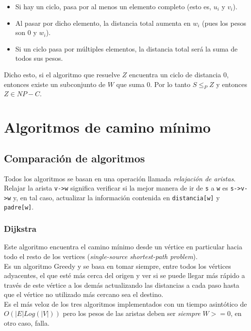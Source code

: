 \documentclass{article}
\def\code#1{\texttt{#1}}
\newcommand\tab[1][0.5cm]{\hspace*{#1}}
\begin{document}
\begin{enumerate}
\begin{itemize}
                    \item Si hay un ciclo, pasa por al menos un elemento completo (esto es, $u_{i}$ y $v_{i}$).
                    \item Al pasar por dicho elemento, la distancia total aumenta en $w_{i}$ (pues los pesos son $0$
                    y $w_{i}$).
                    \item Si un ciclo pasa por múltiples elementos, la distancia total será la suma de todos sus pesos.
                \end{itemize}
            \tab\tab Dicho esto, si el algoritmo que resuelve $Z$ encuentra un ciclo de distancia $0$, entonces existe
            un subconjunto de $W$ que suma $0$. Por lo tanto $S \leq_{P} Z$ y entonces $Z \in NP-C$.


    \end{enumerate}

    \newpage

    \section{Algoritmos de camino mínimo}
        \subsection{Comparación de algoritmos}
            \tab Todos los algoritmos se basan en una operación llamada \emph{relajación de aristas}. Relajar
        la arista \code{v->w} significa verificar si la mejor manera de ir de \code{s} a \code{w} es \code{s->v->w}
        y, en tal caso, actualizar la información contenida en \code{distancia[w]} y \code{padre[w]}.

            \subsubsection{Dijkstra}
            \tab Este algoritmo encuentra el camino mínimo desde un vértice en particular hacia todo
            el resto de los vertices (\emph{single-source shortest-path problem}). \\
            \tab Es un algoritmo Greedy y se basa en tomar siempre, entre todos los vértices adyacentes,
            el que esté más cerca del origen y ver si se puede llegar más rápido a través de este vértice a los demás
            actualizando las distancias a cada paso hasta que el vértice no utilizado más cercano sea el destino. \\
            \tab Es el más veloz de los tres algoritmos implementados con un tiempo asintótico de
            $O(|E|Log(|V|))$ pero los pesos de las aristas deben ser \emph{siempre} $W >= 0$, en otro caso, falla.
\end{document}
